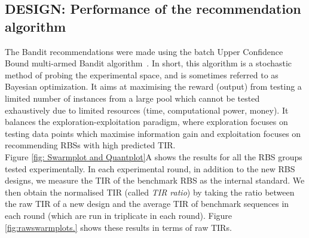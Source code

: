 \documentclass{article}
\begin{document}
\subsection{DESIGN: Performance of the recommendation algorithm}
\label{sec:ucb-results}


The Bandit recommendations were made using the batch Upper Confidence Bound multi-armed Bandit algorithm~\cite{desautels2014parallelizing}.
In short, this algorithm is a stochastic method of probing the experimental space, and is sometimes referred to as Bayesian optimization.
It aims at maximising the reward (output) from testing a limited number of instances from a large pool which cannot be tested exhaustively due to limited resources (time, computational power, money).
It balances the exploration-exploitation paradigm, where exploration focuses on testing data points which maximise information gain and exploitation focuses on recommending RBSs with high predicted TIR.\\

Figure \ref{fig: Swarmplot and Quantplot}A shows the results for all the RBS groups tested experimentally.
In each experimental round, in addition to the new RBS designs, we measure the TIR of the benchmark RBS as the internal standard.
We then obtain the normalised TIR (called \textit{TIR ratio}) by taking the ratio between the raw TIR of a new design and the average TIR of benchmark sequences in each round (which are run in triplicate in each round).
Figure \ref{fig:rawswarmplots.} shows these results in terms of raw TIRs.\\
\end{document}
